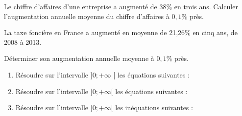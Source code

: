 \documentclass[french]{book}
\begin{document}
\begin{exocor}
Le chiffre d'affaires d'une entreprise a augmenté de $38 \%$ en trois ans.
Calculer l'augmentation annuelle moyenne du chiffre d'affaires à $0,1 \%$ près.
\end{exocor}



\begin{exocor}
La taxe foncière en France a augmenté en moyenne de 21,26\% en cinq ans, de 2008 à 2013.

Déterminer son augmentation annuelle moyenne à $0,1 \%$ près.
\end{exocor}

\begin{exocor}


\begin{enumerate}
\item Résoudre sur l'intervalle $] 0 ;+\infty$ [ les équations suivantes :
\begin{enumerate}
\end{enumerate}

\item Résoudre sur l'intervalle $] 0 ;+\infty[$ les équations suivantes :
\begin{enumerate}

\end{enumerate}
\item Résoudre sur l'intervalle $] 0 ;+\infty[$ les inéquations suivantes :

\begin{enumerate}
\end{enumerate}
\end{enumerate}
\end{exocor}
\end{document}
